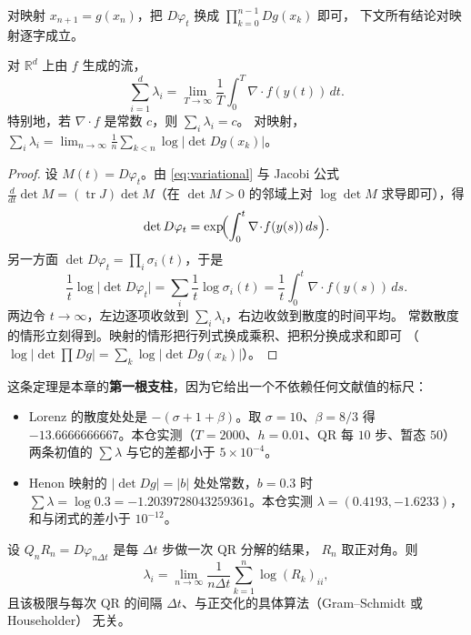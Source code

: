 对映射 $x_{n+1}=g(x_n)$，把 $D\varphi_t$ 换成 $\prod_{k=0}^{n-1}Dg(x_k)$ 即可，
下文所有结论对映射逐字成立。

\begin{theorem}[指数之和等于散度的时间平均]
\label{thm:sum-div}
对 $\mathbb{R}^d$ 上由 $f$ 生成的流，
\begin{equation}
  \sum_{i=1}^{d}\lambda_i=\lim_{T\to\infty}\frac1T\int_0^T\nabla\!\cdot\!f(y(t))\,dt .
  \label{eq:sumdiv}
\end{equation}
特别地，若 $\nabla\!\cdot\!f$ 是常数 $c$，则 $\sum_i\lambda_i=c$。
对映射，$\sum_i\lambda_i=\lim_{n\to\infty}\frac1n\sum_{k<n}\log|\det Dg(x_k)|$。
\end{theorem}

\begin{proof}
设 $M(t)=D\varphi_t$。由 \eqref{eq:variational} 与 Jacobi 公式
$\frac{d}{dt}\det M=(\operatorname{tr}J)\det M$（在 $\det M>0$ 的邻域上对
$\log\det M$ 求导即可），得
\[
  \det D\varphi_t=\exp\!\Bigl(\int_0^t\nabla\!\cdot\!f(y(s))\,ds\Bigr).
\]
另一方面 $\det D\varphi_t=\prod_i\sigma_i(t)$，于是
\[
  \frac1t\log\bigl|\det D\varphi_t\bigr|=\sum_i\frac1t\log\sigma_i(t)
  =\frac1t\int_0^t\nabla\!\cdot\!f(y(s))\,ds .
\]
两边令 $t\to\infty$，左边逐项收敛到 $\sum_i\lambda_i$，右边收敛到散度的时间平均。
常数散度的情形立刻得到。映射的情形把行列式换成乘积、把积分换成求和即可
（$\log|\det\prod Dg|=\sum_k\log|\det Dg(x_k)|$）。
\end{proof}

这条定理是本章的\textbf{第一根支柱}，因为它给出一个不依赖任何文献值的标尺：

\begin{itemize}
  \item Lorenz 的散度处处是 $-\left(\sigma+1+\beta\right)$。取 $\sigma=10$、$\beta=8/3$ 得
        $-13.6666666667$。本仓实测（$T=2000$、$h=0.01$、QR 每 $10$ 步、暂态 $50$）
        两条初值的 $\sum\lambda$ 与它的差都小于 $5\times10^{-4}$。
  \item Henon 映射的 $|\det Dg|=|b|$ 处处常数，$b=0.3$ 时
        $\sum\lambda=\log 0.3=-1.2039728043259361$。本仓实测
        $\lambda=(0.4193,-1.6233)$，和与闭式的差小于 $10^{-12}$。
\end{itemize}

\begin{theorem}
\label{thm:benettin}
设 $Q_nR_n=D\varphi_{n\Delta t}$ 是每 $\Delta t$ 步做一次 QR 分解的结果，
$R_n$ 取正对角。则
\begin{equation}
  \lambda_i=\lim_{n\to\infty}\frac{1}{n\Delta t}\sum_{k=1}^{n}\log (R_k)_{ii},
  \label{eq:benettin}
\end{equation}
且该极限与每次 QR 的间隔 $\Delta t$、与正交化的具体算法（Gram--Schmidt 或 Householder）
无关。
\end{theorem}

